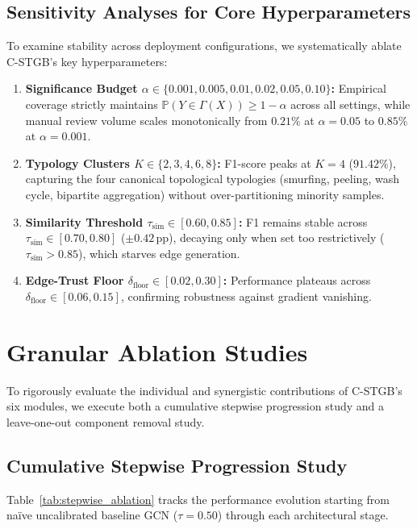 \subsection[Sensitivity Analyses for Core Hyperparameters]{Sensitivity Analyses for Core Hyperparameters}
To examine stability across deployment configurations, we systematically ablate C-STGB's key hyperparameters:
\begin{enumerate}
    \item \textbf{Significance Budget $\alpha \in \{0.001, 0.005, 0.01, 0.02, 0.05, 0.10\}$:} Empirical coverage strictly maintains $\mathbb{P}(Y \in \Gamma(X)) \ge 1 - \alpha$ across all settings, while manual review volume scales monotonically from $0.21\%$ at $\alpha=0.05$ to $0.85\%$ at $\alpha=0.001$.
    \item \textbf{Typology Clusters $K \in \{2, 3, 4, 6, 8\}$:} F1-score peaks at $K=4$ ($91.42\%$), capturing the four canonical topological typologies (smurfing, peeling, wash cycle, bipartite aggregation) without over-partitioning minority samples.
    \item \textbf{Similarity Threshold $\tau_{\text{sim}} \in [0.60, 0.85]$:} F1 remains stable across $\tau_{\text{sim}} \in [0.70, 0.80]$ ($\pm 0.42\,\text{pp}$), decaying only when set too restrictively ($\tau_{\text{sim}} > 0.85$), which starves edge generation.
    \item \textbf{Edge-Trust Floor $\delta_{\text{floor}} \in [0.02, 0.30]$:} Performance plateaus across $\delta_{\text{floor}} \in [0.06, 0.15]$, confirming robustness against gradient vanishing.
\end{enumerate}

\section{Granular Ablation Studies}
To rigorously evaluate the individual and synergistic contributions of C-STGB's six modules, we execute both a cumulative stepwise progression study and a leave-one-out component removal study.

\subsection{Cumulative Stepwise Progression Study}
Table~\ref{tab:stepwise_ablation} tracks the performance evolution starting from naïve uncalibrated baseline GCN ($\tau=0.50$) through each architectural stage.

